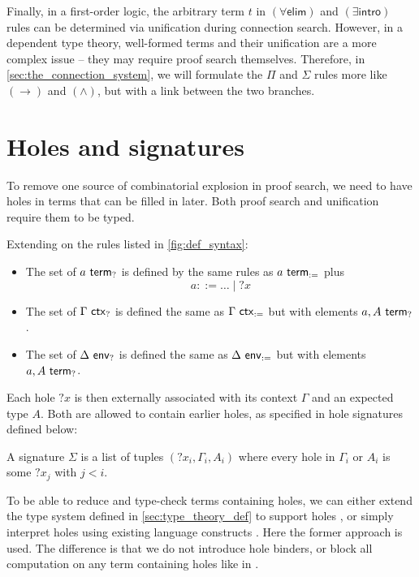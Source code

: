 \documentclass[twoside]{report}
\begin{document}
Finally, in a first-order logic, the arbitrary term $t$ in $({\forall}\mathsf{elim})$ and $({\exists}\mathsf{intro})$ rules can be determined via unification during connection search. However, in a dependent type theory, well-formed terms and their unification are a more complex issue -- they may require proof search themselves. Therefore, in \cref{sec:the_connection_system}, we will formulate the $\Pi$ and $\Sigma$ rules more like $(\to)$ and $(\land)$, but with a link between the two branches.

\section{Holes and signatures}
\label{sec:holes_and_signatures}

To remove one source of combinatorial explosion in proof search, we need to have holes in terms that can be filled in later. Both proof search and unification require them to be typed.

\begin{definition}[Syntax]
    \label{def:hole_syntax}
    Extending on the rules listed in \cref{fig:def_syntax}:
    \begin{itemize}[noitemsep]
        \item The set of $a \ \mathsf{term}_{?}$ is defined by the same rules as $a \ \mathsf{term}_{:=}$ plus
              $$
                  a ::= {} \ldots \mid {?x}
              $$
        \item The set of $\Gamma \ \mathsf{ctx}_{?}$ is defined the same as $\Gamma \ \mathsf{ctx}_{:=}$ but with elements $a, A \ \mathsf{term}_{?}$.
        \item The set of $\Delta \ \mathsf{env}_{?}$ is defined the same as $\Delta \ \mathsf{env}_{:=}$ but with elements $a, A \ \mathsf{term}_{?}$.
    \end{itemize}
\end{definition}

Each hole ${?x}$ is then externally associated with its context $\Gamma$ and an expected type $A$. Both are allowed to contain earlier holes, as specified in hole signatures defined below:

\begin{definition}[Signatures]
    \label{def:hole_signatures}
    A signature $\Sigma$ is a list of tuples $({?x_i}, \Gamma_i, A_i)$ where every hole in $\Gamma_i$ or $A_i$ is some $?x_j$ with $j < i$.
\end{definition}

To be able to reduce and type-check terms containing holes, we can either extend the type system defined in \cref{sec:type_theory_def} to support holes \cite{mcbride2000dependently}, or simply interpret holes using existing language constructs \cite{norell2007towards}. Here the former approach is used. The difference is that we do not introduce hole binders, or block all computation on any term containing holes like in \cite{mcbride2000dependently}. %
\end{document}
